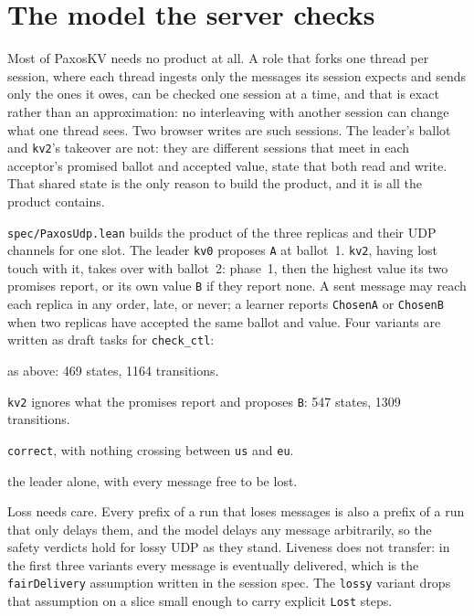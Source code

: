\section{The model the server checks}
Most of PaxosKV needs no product at all. A role that forks one thread per
session, where each thread ingests only the messages its session expects and
sends only the ones it owes, can be checked one session at a time, and that is
exact rather than an approximation: no interleaving with another session can
change what one thread sees. Two browser writes are such sessions. The
leader's ballot and \texttt{kv2}'s takeover are not: they are different
sessions that meet in each acceptor's promised ballot and accepted value, state
that both read and write. That shared state is the only reason to build the
product, and it is all the product contains.

\texttt{spec/PaxosUdp.lean} builds the product of the three replicas and their
UDP channels for one slot. The leader \texttt{kv0} proposes \texttt{A} at
ballot~1. \texttt{kv2}, having lost touch with it, takes over with ballot~2:
phase~1, then the highest value its two promises report, or its own value
\texttt{B} if they report none. A sent message may reach each replica in any
order, late, or never; a learner reports \texttt{ChosenA} or \texttt{ChosenB}
when two replicas have accepted the same ballot and value. Four variants are
written as draft tasks for \texttt{check\_ctl}:

\begin{description}\tightlist
\item[\texttt{correct}] as above: 469 states, 1164 transitions.
\item[\texttt{broken}] \texttt{kv2} ignores what the promises report and
  proposes \texttt{B}: 547 states, 1309 transitions.
\item[\texttt{partitioned}] \texttt{correct}, with nothing crossing between
  \texttt{us} and \texttt{eu}.
\item[\texttt{lossy}] the leader alone, with every message free to be lost.
\end{description}

Loss needs care. Every prefix of a run that loses messages is also a prefix of
a run that only delays them, and the model delays any message arbitrarily, so
the safety verdicts hold for lossy UDP as they stand. Liveness does not
transfer: in the first three variants every message is eventually delivered,
which is the \texttt{fairDelivery} assumption written in the session spec. The
\texttt{lossy} variant drops that assumption on a slice small enough to carry
explicit \texttt{Lost} steps.

